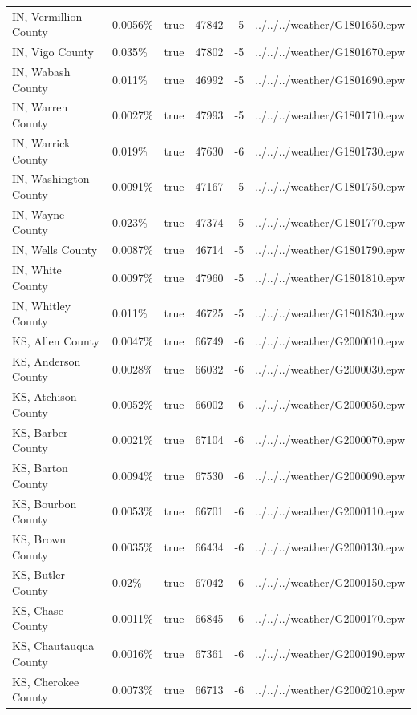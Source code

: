 \begin{longtable}[]{@{}llllll@{}}
IN, Vermillion County & 0.0056\% & true & 47842 & -5 &
../../../weather/G1801650.epw \\
IN, Vigo County & 0.035\% & true & 47802 & -5 &
../../../weather/G1801670.epw \\
IN, Wabash County & 0.011\% & true & 46992 & -5 &
../../../weather/G1801690.epw \\
IN, Warren County & 0.0027\% & true & 47993 & -5 &
../../../weather/G1801710.epw \\
IN, Warrick County & 0.019\% & true & 47630 & -6 &
../../../weather/G1801730.epw \\
IN, Washington County & 0.0091\% & true & 47167 & -5 &
../../../weather/G1801750.epw \\
IN, Wayne County & 0.023\% & true & 47374 & -5 &
../../../weather/G1801770.epw \\
IN, Wells County & 0.0087\% & true & 46714 & -5 &
../../../weather/G1801790.epw \\
IN, White County & 0.0097\% & true & 47960 & -5 &
../../../weather/G1801810.epw \\
IN, Whitley County & 0.011\% & true & 46725 & -5 &
../../../weather/G1801830.epw \\
KS, Allen County & 0.0047\% & true & 66749 & -6 &
../../../weather/G2000010.epw \\
KS, Anderson County & 0.0028\% & true & 66032 & -6 &
../../../weather/G2000030.epw \\
KS, Atchison County & 0.0052\% & true & 66002 & -6 &
../../../weather/G2000050.epw \\
KS, Barber County & 0.0021\% & true & 67104 & -6 &
../../../weather/G2000070.epw \\
KS, Barton County & 0.0094\% & true & 67530 & -6 &
../../../weather/G2000090.epw \\
KS, Bourbon County & 0.0053\% & true & 66701 & -6 &
../../../weather/G2000110.epw \\
KS, Brown County & 0.0035\% & true & 66434 & -6 &
../../../weather/G2000130.epw \\
KS, Butler County & 0.02\% & true & 67042 & -6 &
../../../weather/G2000150.epw \\
KS, Chase County & 0.0011\% & true & 66845 & -6 &
../../../weather/G2000170.epw \\
KS, Chautauqua County & 0.0016\% & true & 67361 & -6 &
../../../weather/G2000190.epw \\
KS, Cherokee County & 0.0073\% & true & 66713 & -6 &
../../../weather/G2000210.epw \\

\end{longtable}
